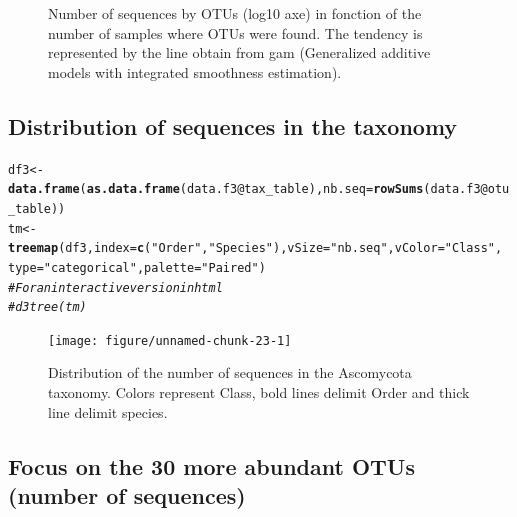 \documentclass[12pt]{article}\usepackage[]{graphicx}\usepackage[]{color}
\makeatletter
\newcommand{\hlstr}[1]{\textcolor[rgb]{0.192,0.494,0.8}{#1}}%
\newcommand{\hlcom}[1]{\textcolor[rgb]{0.678,0.584,0.686}{\textit{#1}}}%
\newcommand{\hlopt}[1]{\textcolor[rgb]{0,0,0}{#1}}%
\newcommand{\hlstd}[1]{\textcolor[rgb]{0.345,0.345,0.345}{#1}}%
\newcommand{\hlkwb}[1]{\textcolor[rgb]{0.69,0.353,0.396}{#1}}%
\newcommand{\hlkwc}[1]{\textcolor[rgb]{0.333,0.667,0.333}{#1}}%
\newcommand{\hlkwd}[1]{\textcolor[rgb]{0.737,0.353,0.396}{\textbf{#1}}}%
\newenvironment{kframe}{%
 \def\at@end@of@kframe{}%
 \ifinner\ifhmode%
  \def\at@end@of@kframe{\end{minipage}}%
  \begin{minipage}{\columnwidth}%
 \fi\fi%
 \def\FrameCommand##1{\hskip\@totalleftmargin \hskip-\fboxsep
 \colorbox{shadecolor}{##1}\hskip-\fboxsep
     \hskip-\linewidth \hskip-\@totalleftmargin \hskip\columnwidth}%
 \MakeFramed {\advance\hsize-\width
   \@totalleftmargin\z@ \linewidth\hsize
   \@setminipage}}%
 {\par\unskip\endMakeFramed%
 \at@end@of@kframe}
\newenvironment{knitrout}{}{} %
\numberwithin{figure}{section}
\makeatother
\begin{document}
\begin{knitrout}
\begin{figure}
{}

\caption[Number of sequences by OTUs (log10 axe) in fonction of the number of samples where OTUs were found]{Number of sequences by OTUs (log10 axe) in fonction of the number of samples where OTUs were found. The tendency is represented by the line obtain from gam (Generalized additive models with integrated smoothness estimation).}\label{fig:unnamed-chunk-22}
\end{figure}


\end{knitrout}

  \subsection{Distribution of sequences in the taxonomy}
\begin{knitrout}\small
{}\color{fgcolor}\begin{kframe}
\begin{alltt}
\hlstd{df3} \hlkwb{<-} \hlkwd{data.frame}\hlstd{(}\hlkwd{as.data.frame}\hlstd{(data.f3}\hlopt{@}\hlkwc{tax_table}\hlstd{),} \hlkwc{nb.seq} \hlstd{=} \hlkwd{rowSums}\hlstd{(data.f3}\hlopt{@}\hlkwc{otu_table}\hlstd{))}
\hlstd{tm} \hlkwb{<-} \hlkwd{treemap}\hlstd{(df3,} \hlkwc{index} \hlstd{=} \hlkwd{c}\hlstd{(}\hlstr{"Order"}\hlstd{,} \hlstr{"Species"}\hlstd{),} \hlkwc{vSize} \hlstd{=} \hlstr{"nb.seq"}\hlstd{,} \hlkwc{vColor} \hlstd{=} \hlstr{"Class"}\hlstd{,}
        \hlkwc{type} \hlstd{=} \hlstr{"categorical"}\hlstd{,} \hlkwc{palette} \hlstd{=} \hlstr{"Paired"}\hlstd{)}
\hlcom{# For an interactive version in html}
\hlcom{# d3tree(tm)}
\end{alltt}
\end{kframe}\begin{figure}

{\centering \texttt{[image: figure/unnamed-chunk-23-1]} 

}

\caption[Distribution of the number of sequences in the Ascomycota taxonomy]{Distribution of the number of sequences in the Ascomycota taxonomy. Colors represent Class, bold lines delimit Order and thick line delimit species.}\label{fig:unnamed-chunk-23}
\end{figure}


\end{knitrout}

  \subsection{Focus on the 30 more abundant OTUs (number of sequences)}
\end{document}
